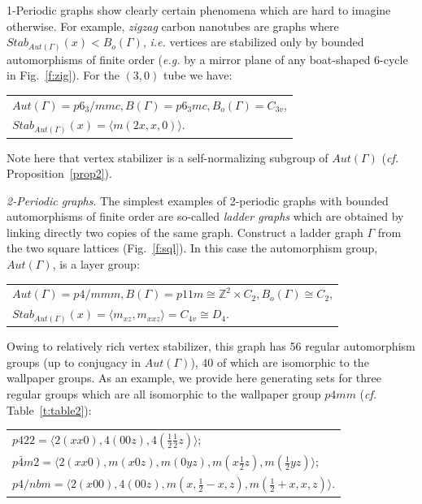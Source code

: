 \documentclass[11pt,a4paper]{article}
\newcommand{\Z}{\mathbb Z}
\begin{document}
1-Periodic graphs show clearly certain phenomena which are hard to imagine otherwise. For example, \emph{zigzag} carbon nanotubes are graphs where  $Stab_{Aut(\Gamma)}(x) < B_o(\Gamma)$, \emph{i.e.} vertices are stabilized only by bounded automorphisms of finite order (\emph{e.g.} by a mirror plane of any boat-shaped 6-cycle in Fig.~\ref{f:zig}). For the $(3, 0)$ tube we have: 

\begin{center}
\begin{tabular}{l}
$Aut(\Gamma) = p6_3/mmc, B(\Gamma) = p6_3mc, B_o(\Gamma) = C_{3v}$,\\
$Stab_{Aut(\Gamma)}(x) = \langle m(2x,x,0) \rangle$.
\end{tabular}
\end{center}

\noindent Note here that vertex stabilizer is a self-normalizing subgroup of $Aut(\Gamma)$ (\emph{cf.} Proposition~\ref{prop2}).


\medskip

\noindent \emph{2-Periodic graphs}. The simplest examples of 2-periodic graphs with bounded automorphisms of finite order are so-called \emph{ladder graphs} which are obtained by linking directly two copies of the same graph. Construct a ladder graph $\Gamma$ from the two square lattices (Fig.~\ref{f:sql}). In this case the automorphism group, $Aut(\Gamma)$, is a layer group:

\begin{center}
\begin{tabular}{l}
$Aut(\Gamma) = p4/mmm, B(\Gamma) = p11m \cong \Z^2 \times C_2, B_o(\Gamma) \cong C_2$,\\
$Stab_{Aut(\Gamma)}(x) = \langle m_{xz}, m_{xxz} \rangle = C_{4v} \cong D_4$.
\end{tabular}
\end{center}


\noindent Owing to relatively rich vertex stabilizer, this graph has 56 regular automorphism groups (up to conjugacy in $Aut(\Gamma)$), 40 of which are isomorphic to the wallpaper groups. As an example, we provide here generating sets for three regular groups which are all isomorphic to the wallpaper group $p4mm$ (\emph{cf.} Table~\ref{t:table2}):

\begin{center}
\begin{tabular}{l}
$p422 = \langle 2(xx0), 4(00z), 4(\frac{1}{2}\frac{1}{2}z) \rangle$;\\
$p\bar4m2 =  \langle 2(xx0), m(x0z), m(0yz), m(x\frac{1}{2}z), m(\frac{1}{2}yz) \rangle$;\\
$p4/nbm = \langle 2(x00), 4(00z), m(x, \frac{1}{2}-x, z), m(\frac{1}{2}+x, x, z) \rangle$.
\end{tabular}
\end{center}
\end{document}

